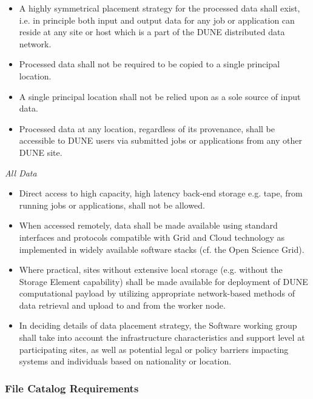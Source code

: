\begin{itemize}
\item A highly symmetrical placement strategy for the processed data shall exist, i.e. in principle both input and output data for any job or application can reside at any site or host which is a part of the DUNE distributed data network.

\item Processed data shall not be required to be copied to a single principal location.

\item A single principal location shall not be relied upon as a sole source of input data.

\item Processed data at any location, regardless of its provenance,  shall be accessible to DUNE users via submitted jobs or applications from any other DUNE site.
\end{itemize}
\noindent
\textit{All Data}
\begin{itemize}
\item Direct access to high capacity, high latency back-end storage e.g. tape, from running jobs or applications, shall not be allowed.

\item When accessed remotely, data shall be made available using standard interfaces and protocols compatible with Grid and Cloud technology as implemented in widely available software stacks (cf. the Open Science Grid).

\item Where practical, sites without extensive local storage (e.g. without the Storage Element capability) shall be made available for deployment of DUNE 
computational payload by utilizing appropriate network-based methods of data retrieval and upload to and from the worker node.

\item In deciding details of data placement strategy, the Software working group shall take into account the infrastructure characteristics
and support level at participating sites, as well as potential legal or policy barriers impacting systems and individuals based on nationality or location.


\end{itemize}

\subsubsection{File Catalog Requirements}

